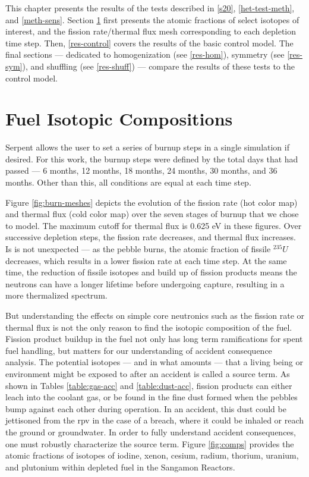 \label{res}
This chapter presents the results of the tests described in \autoref{s20},  \ref{het-test-meth}, and  \ref{meth-sens}.  Section \ref{res-comps} first presents the atomic fractions of select isotopes of interest, and the fission rate/thermal flux mesh corresponding to each depletion time step.  Then, \autoref{res-control} covers the results of the basic control model. The final sections --- dedicated to homogenization (see \autoref{res-hom}), symmetry (see \autoref{res-sym}), and shuffling (see \autoref{res-shuff}) --- compare the results of these tests to the control model.

\section{Fuel Isotopic Compositions}
\label{res-comps}

Serpent allows the user to set a series of burnup steps in a single simulation if desired.  For this work, the burnup steps were defined by the total days that had passed --- 6 months, 12 months, 18 months, 24 months, 30 months, and 36 months.  Other than this, all conditions are equal at each time step.



Figure \ref{fig:burn-meshes} depicts the evolution of the fission rate (hot color map) and thermal flux (cold color map) over the seven stages of burnup that we chose to model.  The maximum cutoff for thermal flux is 0.625 eV in these figures.  Over successive depletion steps, the fission rate decreases, and thermal flux increases.  Is is not unexpected --- as the pebble burns, the atomic fraction of fissile $^{235}U$ decreases, which results in a lower fission rate at each time step.  At the same time, the reduction of fissile isotopes and build up of fission products means the neutrons can have a longer lifetime before undergoing capture, resulting in a more thermalized spectrum.

But understanding the effects on simple core neutronics such as the fission rate or thermal flux is not the only reason to find the isotopic composition of the fuel.  Fission product buildup in the fuel not only has long term ramifications for spent fuel handling, but matters for our understanding of accident consequence analysis.  The potential isotopes --- and in what amounts --- that a living being or environment might be exposed to after an accident is called a source term.  As shown in Tables \ref{table:gas-acc} and \ref{table:dust-acc}, fission products can either leach into the coolant gas, or be found in the fine dust formed when the pebbles bump against each other during operation.  In an accident, this dust could be jettisoned from the \acrshort{rpv} in the case of a breach, where it could be inhaled or reach the ground or groundwater.  In order to fully understand accident consequences, one must robustly characterize the source term.  Figure \ref{fig:comps} provides the atomic fractions of isotopes of iodine, xenon, cesium, radium, thorium, uranium, and plutonium within depleted fuel in the Sangamon Reactors.

